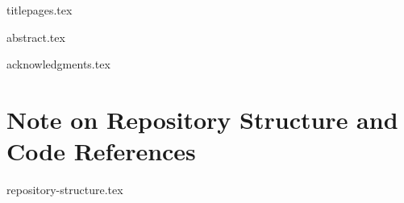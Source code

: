 {titlepages.tex}

\newpage
{}
\setcounter{page}{1}

\newpage
{abstract.tex}

\newpage
{acknowledgments.tex}

\newpage
\tableofcontents

\newpage
\section*{Note on Repository Structure and Code References}
{repository-structure.tex}